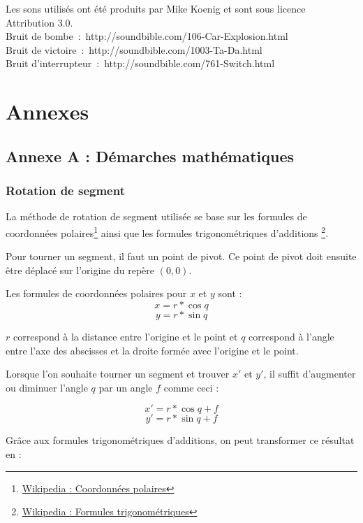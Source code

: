 \documentclass[]{article}
\begin{document}
Les sons utilisés ont été produits par Mike Koenig et sont sous licence Attribution 3.0.\\

Bruit de bombe~:~http://soundbible.com/106-Car-Explosion.html \\
Bruit de victoire~:~http://soundbible.com/1003-Ta-Da.html \\
Bruit d’interrupteur~:~http://soundbible.com/761-Switch.html \\

\section{\label{Annexe}Annexes}

\subsection{Annexe A : Démarches mathématiques}

\subsubsection{\label{AnnexeRotation}Rotation de segment}

La méthode de rotation de segment utilisée se base sur les formules
de coordonnées polaires\footnote{\href{http://fr.wikipedia.org/wiki/Coordonn\%C3\%A9es\_polaires}{Wikipedia : Coordonnées polaires}}
ainsi que les formules trigonométriques d'additions
\footnote{\href{http://fr.wikipedia.org/wiki/Trigonom\%C3\%A9trie}{Wikipedia : Formules trigonométriques}}.

Pour tourner un segment, il faut un point de pivot. Ce point de pivot
doit ensuite être déplacé sur l'origine du repère $ (0, 0) $.

Les formules de coordonnées polaires pour $ x $ et $ y $ sont :
$$ x = r * \cos{q} $$ 
$$ y = r * \sin{q} $$

$ r $ correspond à la distance entre l'origine et le point et $ q $ correspond 
à l'angle entre l'axe des abscisses et la droite formée avec l'origine et le point.

Lorsque l'on souhaite tourner un segment et trouver $ x' $ et $ y' $, 
il suffit d'augmenter ou diminuer l'angle $ q $ par un angle $ f $ comme ceci :

$$ x' = r * \cos{q + f} $$
$$ y' = r * \sin{q + f} $$

Grâce aux formules trigonométriques d'additions, on peut transformer ce résultat en :
\end{document}

